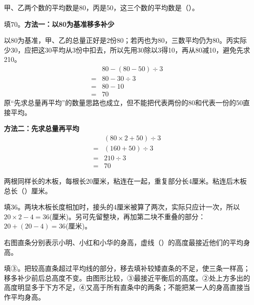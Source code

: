 甲、乙两个数的平均数是80，丙是50，这三个数的平均数是（\hspace{1.8em}）。\par
\begin{BookAnswer}
填\(70\)。\textbf{方法一：以80为基准移多补少}\par 以80为基准，甲、乙的总量正好是2份80；若丙也为80，三数平均仍为80。丙实际少30，应把这30平均从3份中扣去，所以先用30除以3得10，再从80减10，避免先求210。\[\begin{aligned}&80-(80-50)\div3\\={}&80-30\div3\\={}&80-10\\={}&70\end{aligned}\]原“先求总量再平均”的数量思路也成立，但不能把代表两份的80和代表一份的50直接平均。\par\textbf{方法二：先求总量再平均}\[\begin{aligned}&(80\times2+50)\div3\\={}&(160+50)\div3\\={}&210\div3\\={}&70\end{aligned}\]
\end{BookAnswer}

两根同样长的木板，每根长20厘米，粘连在一起，重复部分长4厘米。粘连后木板总长（\hspace{1.8em}）厘米。\par
\begin{BookAnswer}
填\(36\)。两块木板长度相加时，接头的\(4\)厘米被算了两次，实际只应计一次，所以\(20\times2-4=36\)(厘米)。另可先留整块，再加第二块不重叠的部分：\(20+(20-4)=36\)(厘米)。
\end{BookAnswer}

右图直条分别表示小明、小红和小华的身高，虚线（\hspace{1.8em}）的高度最接近他们的平均身高。\par
{}
\begin{BookAnswer}
填③。把较高直条超过平均线的部分，移去填补较矮直条的不足，使三条一样高；移多补少前后总高度不变。由图形比较，③最接近平衡后的高度。②处上方多出的高度明显多于下方不足，④又高于所有直条中的两条；不能把某一人的身高直接当作平均身高。
\end{BookAnswer}

